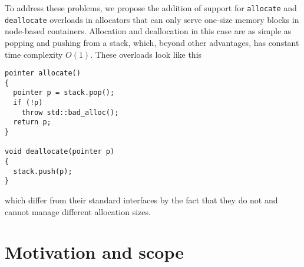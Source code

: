 \documentclass[11pt]{article}
\begin{document}
To address these problems, we propose the addition of support for
\texttt{allocate} and \texttt{deallocate} overloads in allocators that can only
serve one-size memory blocks in node-based containers.  Allocation and
deallocation in this case are as simple as popping and pushing from a stack,
which, beyond other advantages, has constant time complexity $O(1)$.  These
overloads look like this

\medskip
\begin{lstlisting}
pointer allocate()
{
  pointer p = stack.pop(); 
  if (!p)
    throw std::bad_alloc();
  return p; 
}

void deallocate(pointer p)
{
  stack.push(p);
}
\end{lstlisting}
which differ from their standard interfaces by the fact
that they do not and cannot manage different allocation sizes.

\section{Motivation and scope}
\end{document}
